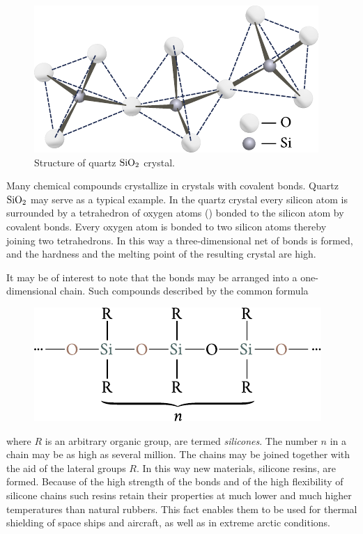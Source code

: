 \begin{figure}[t]
	\begin{center}
		\includegraphics[scale=1.0]{figures/ch_01/fig_1_20.pdf}
		\caption[]{Structure of quartz $\ce{SiO2}$ crystal.}
		\label{fig:1_20}
	\end{center}
	\vspace{-0.7cm}
\end{figure}

Many chemical compounds crystallize in crystals with covalent bonds. Quartz $\ce{SiO2}$ may serve as a typical example. In the quartz crystal every silicon atom is surrounded by a tetrahedron of oxygen atoms () bonded to the silicon atom by covalent bonds. Every oxygen atom is bonded to two silicon atoms thereby joining two tetrahedrons. In this way a three-dimensional net of  bonds is formed, and the hardness and the melting point of the resulting crystal are high.

It may be of interest to note that the  bonds may be arranged into a one-dimensional chain. Such compounds described by the common formula
\begin{figure}[h]
	\begin{center}
		\includegraphics[scale=0.95]{figures/ch_01/chemical_formula_quartz.pdf}
	\end{center}
	\vspace{-0.7cm}
\end{figure}

\noindent
where $R$ is an arbitrary organic group, are termed \textit{silicones}. The number $n$ in a chain may be as high as several million. The chains may be joined together with the aid of the lateral groups $R$. In this way new materials, silicone resins, are formed. Because of the high strength of the  bonds and of the high flexibility of silicone chains such resins retain their properties at much lower and much higher temperatures than natural rubbers. This fact enables them to be used for thermal shielding of space ships and aircraft, as well as in extreme arctic conditions.

